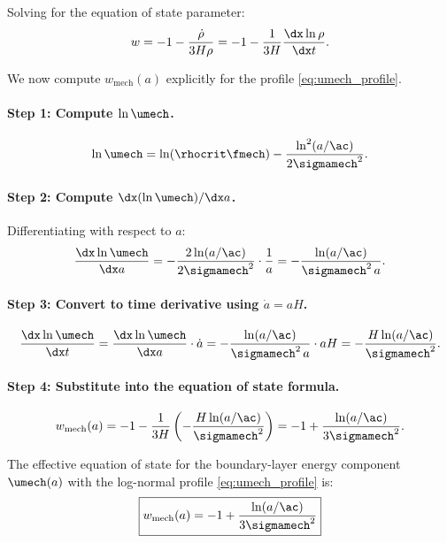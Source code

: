 Solving for the equation of state parameter:
\begin{equation}
\label{eq:w_from_continuity}
w = -1 - \frac{\dot{\rho}}{3H\rho} = -1 - \frac{1}{3H}\frac{\dx \ln\rho}{\dx t}.
\end{equation}

We now compute $w_{\mathrm{mech}}(a)$ explicitly for the profile \eqref{eq:umech_profile}.

\paragraph{Step 1: Compute $\ln \umech$.}
\begin{equation}
\ln \umech = \ln(\rhocrit \fmech) - \frac{\ln^2(a/\ac)}{2\sigmamech^2}.
\end{equation}

\paragraph{Step 2: Compute $\dx(\ln \umech)/\dx a$.}
Differentiating with respect to $a$:
\begin{equation}
\frac{\dx \ln \umech}{\dx a} = -\frac{2 \ln(a/\ac)}{2\sigmamech^2} \cdot \frac{1}{a} = -\frac{\ln(a/\ac)}{\sigmamech^2 \, a}.
\end{equation}

\paragraph{Step 3: Convert to time derivative using $\dot{a} = aH$.}
\begin{equation}
\frac{\dx \ln \umech}{\dx t} = \frac{\dx \ln \umech}{\dx a} \cdot \dot{a} = -\frac{\ln(a/\ac)}{\sigmamech^2 \, a} \cdot aH = -\frac{H \ln(a/\ac)}{\sigmamech^2}.
\end{equation}

\paragraph{Step 4: Substitute into the equation of state formula.}
\begin{equation}
w_{\mathrm{mech}}(a) = -1 - \frac{1}{3H}\left( -\frac{H\ln(a/\ac)}{\sigmamech^2} \right) = -1 + \frac{\ln(a/\ac)}{3\sigmamech^2}.
\end{equation}

\begin{proposition}
\label{prop:wmech}
The effective equation of state for the boundary-layer energy component $\umech(a)$ with the log-normal profile \eqref{eq:umech_profile} is:
\begin{equation}
\label{eq:wmech_result}
\boxed{w_{\mathrm{mech}}(a) = -1 + \frac{\ln(a/\ac)}{3\sigmamech^2}}
\end{equation}
\end{proposition}

